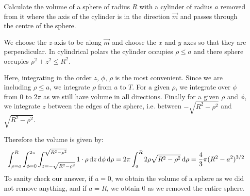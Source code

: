 \documentclass[../main.tex]{subfiles}
\begin{document}
\begin{example}
  Calculate the volume of a sphere of radius $R$ with a cylinder of radius $a$ removed from it where the axis of the cylinder is in the direction $\vec{m}$ and passes through the centre of the sphere.

  We choose the $z$-axis to be along $\vec{m}$ and choose the $x$ and $y$ axes so that they are perpendicular.
  In cylindrical polars the cylinder occupies $\rho \leq a$ and there sphere occupies $\rho^2 + z^2 \leq R^2$.

  Here, integrating in the order $z$, $\phi$, $\rho$ is the most convenient.
  Since we are including $\rho \leq a$, we integrate $\rho$ from $a$ to $T$.
  For a given $\rho$, we integrate over $\phi$ from 0 to $2\pi$ as we still have volume in all directions.
  Finally for a given $\rho$ and $\phi$, we integrate $z$ between the edges of the sphere, i.e. between $-\sqrt{R^2 - \rho^2}$ and $\sqrt{R^2 - \rho^2}$.

  Therefore the volume is given by:
  \[
    \int_{\rho = a}^{R} \int_{\phi = 0}^{2\pi} \int_{z = - \sqrt{R^2 - \rho^2}}^{\sqrt{R^2 - \rho^2}} 1 \cdot \rho \d{z} \d{\phi} \d{\rho} = 2\pi \int_{a}^{R} 2\rho\sqrt{R^2 - \rho^2} \d{\rho} = \frac{4}{3} \pi(R^2 - a^2)^{3/2}
  \]
  To sanity check our answer, if $a = 0$, we obtain the volume of a sphere as we did not remove anything, and if $a = R$, we obtain 0 as we removed the entire sphere.
\end{example}
\end{document}
